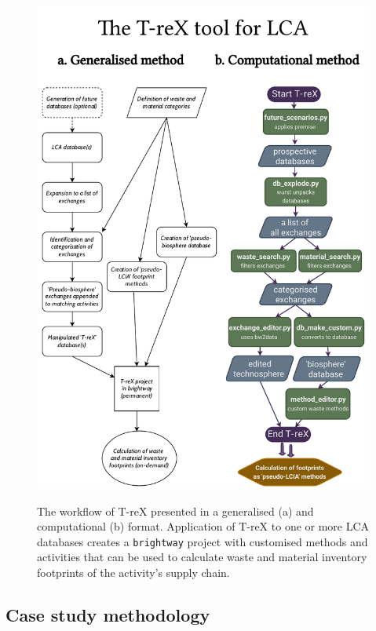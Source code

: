 \documentclass[a4paper,fleqn]{cas-dc}
\renewcommand{\texttt}[1]{{\ttfamily\small\nolinkurl{#1}}}
\begin{document}
\begin{figure}
	\centering
	\caption{The workflow of T-reX presented in a generalised (a) and computational (b) format. Application of T-reX to one or more LCA databases creates a \texttt{brightway} project with customised methods and activities that can be used to calculate waste and material inventory footprints of the activity's supply chain.}
	\includegraphics[width=1.8\columnwidth]{figures/T-reX_method.pdf}\label{fig:methods-flowchart}
\end{figure}

\subsection{Case study methodology}\label{sec:method-casestudy}
\end{document}
